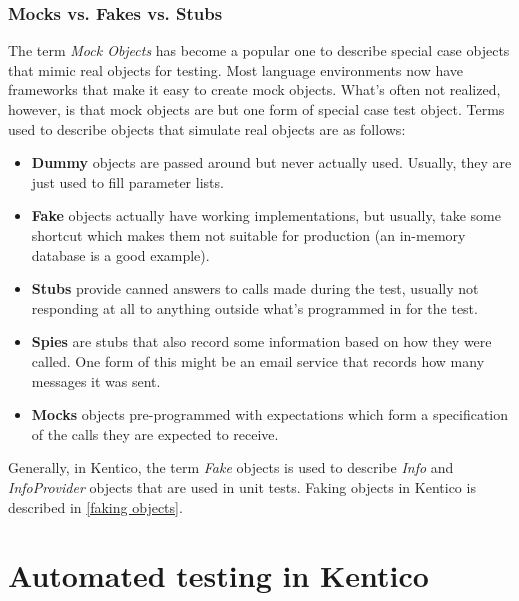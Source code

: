 \documentclass[
  print,
  table,
  nolof,
  nolot,
  nocover,
  oneside
]{fithesis3}
\begin{document}
\subsection{Mocks vs. Fakes vs. Stubs}
\label{mocks vs. fakes vs. stubs}

The term \textit{Mock Objects} has become a popular one to describe special case objects that mimic real objects for testing. Most language environments now have frameworks that make it easy to create mock objects. What's often not realized, however, is that mock objects are but one form of special case test object\parencite{mocks}. Terms used to describe objects that simulate real objects are as follows:
\begin{itemize}
    \item \textbf{Dummy} objects are passed around but never actually used. Usually, they are just used to fill parameter lists.
    \item \textbf{Fake} objects actually have working implementations, but usually, take some shortcut which makes them not suitable for production (an in-memory database is a good example).
    \item \textbf{Stubs} provide canned answers to calls made during the test, usually not responding at all to anything outside what's programmed in for the test.
    \item \textbf{Spies} are stubs that also record some information based on how they were called. One form of this might be an email service that records how many messages it was sent.
    \item \textbf{Mocks} objects pre-programmed with expectations which form a specification of the calls they are expected to receive.
\end{itemize}

Generally, in Kentico, the term \textit{Fake} objects is used to describe \textit{Info} and \textit{InfoProvider} objects that are used in unit tests. Faking objects in Kentico is described in \autoref{faking objects}.



\chapter{Automated testing in Kentico}
\label{automated testing in Kentico}
\end{document}
